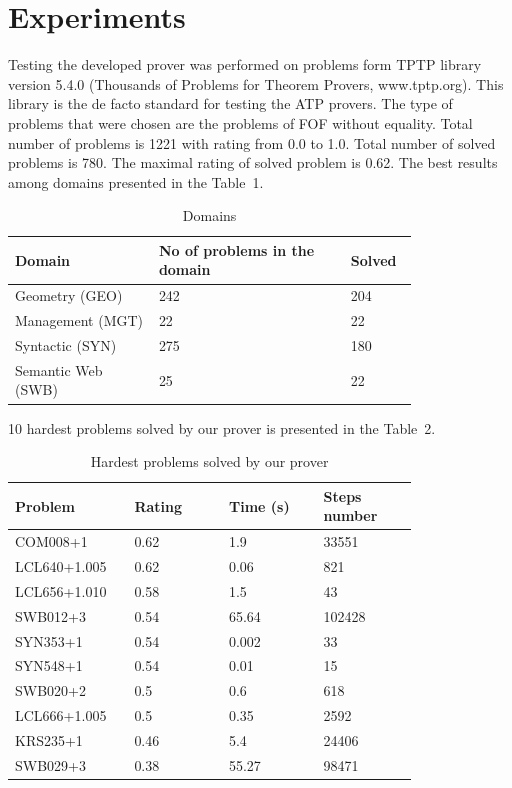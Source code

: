 \documentclass[runningheads,a4paper]{llncs}
\begin{document}
\section{Experiments}
Testing the developed prover was performed on problems form TPTP \cite{tptp} library version 5.4.0 (Thousands of Problems for Theorem Provers, www.tptp.org). This library is the de facto standard for testing the ATP provers. The type of problems that were chosen are the problems of FOF without equality. Total number of problems is 1221 with rating from 0.0 to 1.0. Total number of solved problems is 780. The maximal rating of solved problem is 0.62. The best results among domains presented in the Table~1.

\begin{table}
\caption{Domains}
\begin{tabular}{|p{0.3\linewidth}|p{0.4\linewidth}|p{0.1\linewidth}|}

\hline
\textbf{Domain} & \textbf{No of problems in the domain} & \textbf{Solved} \\
\hline
Geometry (GEO) & 242 & 204 \\
\hline
Management (MGT) & 22 & 22 \\
\hline
Syntactic  (SYN) & 275 & 180 \\
\hline
Semantic Web  (SWB) & 25 & 22 \\
\hline
\end{tabular}
\end{table}

10 hardest problems solved by our prover is presented in the Table~2.
\begin{table}
\caption{Hardest problems solved by our prover}
\begin{tabular}{|p{0.2\linewidth}|p{0.2\linewidth}|p{0.2\linewidth}|p{0.2\linewidth}|}

\hline
\textbf{Problem} & \textbf{Rating} & \textbf{Time (s)} & \textbf{Steps number} \\
\hline
COM008+1 & 0.62 & 1.9 & 33551 \\
\hline
LCL640+1.005 &  0.62 &  0.06 &  821 \\
\hline
LCL656+1.010 &  0.58 &  1.5 &  43 \\
\hline
SWB012+3 &  0.54 &  65.64 &  102428 \\
\hline
SYN353+1 &  0.54 &  0.002 &  33 \\
\hline
SYN548+1 &  0.54 &  0.01 &  15 \\
\hline
SWB020+2 &  0.5 &  0.6 &  618 \\
\hline
LCL666+1.005 &  0.5 &  0.35 &  2592 \\
\hline
KRS235+1 & 0.46 & 5.4 & 24406 \\
\hline
SWB029+3 &  0.38 &  55.27 &  98471 \\
\hline
\end{tabular}
\end{table}
\end{document}
